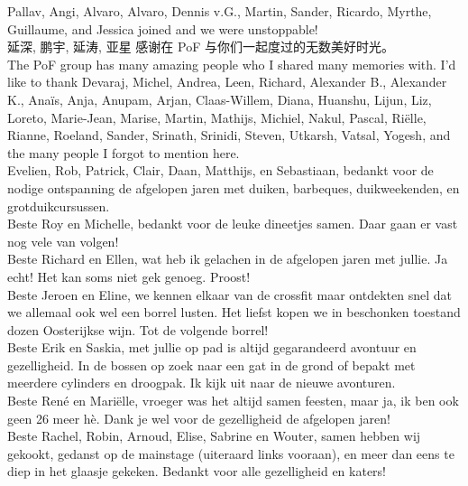Pallav, Angi, Alvaro, Alvaro, Dennis v.G., Martin, Sander, Ricardo, Myrthe,
Guillaume, and Jessica joined and we were unstoppable!\\
\mf{\flagcn}\indent 延深, 鹏宇, 延涛, 亚星 感谢在 PoF 与你们一起度过的无数美好时光。\\
\mf{\flagus}\indent The PoF group has many amazing people who I shared many
memories with. I'd like to thank Devaraj, Michel, Andrea, Leen, Richard,
Alexander B., Alexander K., Ana\"is, Anja, Anupam, Arjan, Claas-Willem, Diana,
Huanshu, Lijun, Liz, Loreto, Marie-Jean, Marise, Martin, Mathijs, Michiel,
Nakul, Pascal, Ri\"elle, Rianne, Roeland, Sander, Srinath, Srinidi, Steven,
Utkarsh, Vatsal, Yogesh, and the many people I forgot to mention here.\\  
\mf{\flagnl}\indent Evelien, Rob, Patrick, Clair, Daan, Matthijs, en
Sebastiaan, bedankt voor de nodige ontspanning de afgelopen jaren met duiken,
barbeques, duikweekenden, en grotduikcursussen.\\
\indent Beste Roy en Michelle, bedankt voor de leuke dineetjes samen. Daar gaan er
vast nog vele van volgen! \\
\indent Beste Richard en Ellen, wat heb ik gelachen in de afgelopen jaren met
jullie. Ja echt! Het kan soms niet gek genoeg. Proost!\\
\indent Beste Jeroen en Eline, we kennen elkaar van de crossfit maar ontdekten
snel dat we allemaal ook wel een borrel lusten. Het liefst kopen we in
beschonken toestand dozen Oosterijkse wijn. Tot de volgende borrel!\\
\indent Beste Erik en Saskia, met jullie op pad is altijd gegarandeerd
avontuur en gezelligheid. In de bossen op zoek naar een gat in de grond of
bepakt met meerdere cylinders en droogpak. Ik kijk uit naar de nieuwe
avonturen.\\
\indent Beste Ren\'e en Mari\"elle, vroeger was het altijd samen feesten,
maar ja, ik ben ook geen 26 meer h\`e. Dank je wel voor de gezelligheid de
afgelopen jaren!\\
\indent Beste Rachel, Robin, Arnoud, Elise, Sabrine en Wouter, samen hebben
wij gekookt, gedanst op de mainstage (uiteraard links vooraan), en meer dan
eens te diep in het glaasje gekeken. Bedankt voor alle gezelligheid en
katers!\\
